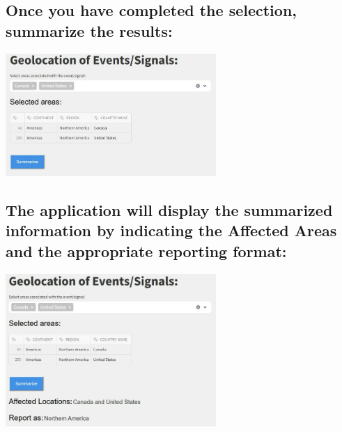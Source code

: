 \documentclass[a4paper,12pt]{article}
\begin{document}
\subsection{Once you have completed the selection, summarize the results:}

\begin{center}
    \includegraphics[width=0.6\textwidth]{images/find_area_03.png}
\end{center}

\subsection{The application will display the summarized information by indicating the Affected Areas and the appropriate reporting format:}

\begin{center}
    \includegraphics[width=0.6\textwidth]{images/find_area_04.png}
\end{center}
\end{document}
